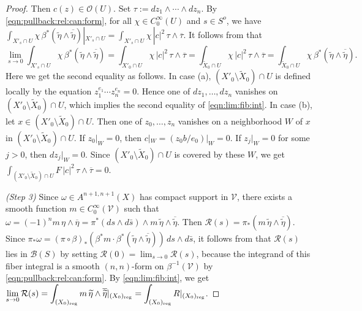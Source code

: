 \documentclass[amscd, leqno]{amsart}
\theoremstyle{plain}
\theoremstyle{definition}
\theoremstyle{remark}
\newenvironment{pf}{\begin{proof}}{\end{proof}}
\begin{document}
\begin{pf}
Then $c(z)\in{\mathcal O}(U)$. 
Set $\tau:=dz_{1}\wedge\cdots\wedge dz_{n}$. By \eqref{eqn:pullback:rel:can:form}, for all $\chi\in C_{0}^{\infty}(U)$ and $s\in S^{o}$, 
we have
$\displaystyle \int_{X'_{s}\cap U} \chi\,\beta^{*}(\widetilde{\eta}\wedge\overline{\widetilde{\eta}})|_{X'_{s}\cap U} 
= \int_{X'_{s}\cap U} \chi\,|c|^{2}\,\tau\wedge\overline{\tau}$. It follows from \cite[Th.\,1]{Barlet82} that
\begin{equation}
\label{eqn:lim:fib:int}
\lim_{s\to0}\int_{X'_{s}\cap U} \chi\,\beta^{*}(\widetilde{\eta}\wedge\overline{\widetilde{\eta}})
=
\int_{X'_{0}\cap U} \chi\,|c|^{2}\,\tau\wedge\overline{\tau}
=
\int_{\widetilde{X}_{0}\cap U} \chi\,|c|^{2}\,\tau\wedge\overline{\tau}
=
\int_{\widetilde{X}_{0}\cap U} \chi\,\beta^{*}(\widetilde{\eta}\wedge\overline{\widetilde{\eta}}).
\end{equation}
Here we get the second equality as follows. 
In case (a), $(X'_{0}\setminus\widetilde{X}_{0})\cap U$ is defined locally by the equation $z_{1}^{e_{1}}\cdots z_{n}^{e_{n}}=0$.
Hence one of $dz_{1},\ldots,dz_{n}$ vanishes on $(X'_{0}\setminus\widetilde{X}_{0})\cap U$, 
which implies the second equality of \eqref{eqn:lim:fib:int}. 
In case (b), let $x \in (X'_{0}\setminus\widetilde{X}_{0})\cap U$. 
Then one of $z_{0},\ldots,z_{n}$ vanishes on a neighborhood $W$ of $x$ in $(X'_{0} \setminus \widetilde{X}_{0})\cap U$. 
If $z_{0}|_{W}=0$, then $c|_{W}=(z_{0}b/e_{0})|_{W}=0$. If $z_{j}|_{W}=0$ for some $j>0$, then $dz_{j}|_{W}=0$. 
Since $(X'_{0}\setminus\widetilde{X}_{0})\cap U$ is covered by these $W$, 
we get $\int_{(X'_{0}\setminus\widetilde{X}_{0})\cap U} F\,|c|^{2}\,\tau\wedge\overline{\tau}=0$.
\par{\em (Step 3) }
Since $\omega\in A^{n+1,n+1}(X)$ has compact support in ${\mathcal V}$, 
there exists a smooth function $m\in C_{0}^{\infty}({\mathcal V})$ such that 
$\omega = (-1)^{n}m\,\eta\wedge\overline{\eta} = \pi^{*}(ds\wedge d\bar{s})\wedge m\,\widetilde{\eta}\wedge\overline{\widetilde{\eta}}$.
Then ${\mathcal R}(s) = \pi_{*}(m\,\widetilde{\eta}\wedge\overline{\widetilde{\eta}})$. 
Since $\pi_{*}\omega = (\pi\circ\beta)_{*}(\beta^{*}m \cdot \beta^{*}(\widetilde{\eta}\wedge\overline{\widetilde{\eta}}))\,ds\wedge d\bar{s}$,
it follows from \cite[Th.\,1]{Barlet82} that ${\mathcal R}(s)$ lies in ${\mathcal B}(S)$ 
by setting ${\mathcal R}(0) = \lim_{s\to0} {\mathcal R}(s)$,
because the integrand of this fiber integral is a smooth $(n,n)$-form on $\beta^{-1}({\mathcal V})$ by \eqref{eqn:pullback:rel:can:form}.
By \eqref{eqn:lim:fib:int}, we get
$\displaystyle \lim_{s\to0}{\mathcal R}(s) 
= \int_{(X_{0})_{\rm reg}} m\,\widetilde{\eta}\wedge\overline{\widetilde{\eta}}|_{(X_{0})_{\rm reg}} 
= \int_{(X_{0})_{\rm reg}}R|_{(X_{0})_{\rm reg}}$.
\end{pf}
\end{document}
